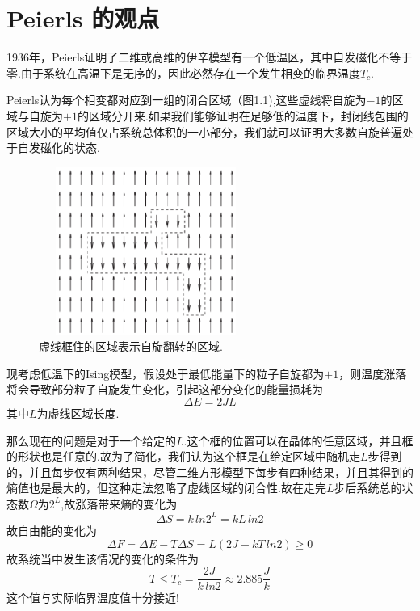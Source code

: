 \documentclass[a4paper]{book}
\begin{document}
\chapter{Peierls 的观点}
1936年，Peierls证明了二维或高维的伊辛模型有一个低温区，其中自发磁化不等于零.由于系统在高温下是无序的，因此必然存在一个发生相变的临界温度$T_c$.\par 
Peierls认为每个相变都对应到一组的闭合区域（图1.1),这些虚线将自旋为$-1$的区域与自旋为$+1$的区域分开来.如果我们能够证明在足够低的温度下，封闭线包围的区域大小的平均值仅占系统总体积的一小部分，我们就可以证明大多数自旋普遍处于自发磁化的状态.
 \begin{figure}[!h]
	\centering
	\includegraphics[width=7cm,height=5.5cm]{figures/1.eps}
	\caption{虚线框住的区域表示自旋翻转的区域.}
\end{figure}
现考虑低温下的Ising模型，假设处于最低能量下的粒子自旋都为$+1$，则温度涨落将会导致部分粒子自旋发生变化，引起这部分变化的能量损耗为
\begin{equation}\label{1.1}
	\varDelta E=2JL
\end{equation}
其中$L$为虚线区域长度.\par 
那么现在的问题是对于一个给定的$L$.这个框的位置可以在晶体的任意区域，并且框的形状也是任意的.故为了简化，我们认为这个框是在给定区域中随机走$L$步得到的，并且每步仅有两种结果，尽管二维方形模型下每步有四种结果，并且其得到的熵值也是最大的，但这种走法忽略了虚线区域的闭合性.故在走完$L$步后系统总的状态数$\Omega$为$2^L$,故涨落带来熵的变化为
\begin{equation}
	\varDelta S=k\,ln2^L=kL\,ln2
\end{equation}
故自由能的变化为
\begin{equation}
	\varDelta F=\varDelta E-T\varDelta S=L(2J-kT\,ln2)\geq0
\end{equation}
故系统当中发生该情况的变化的条件为
\begin{equation}\label{1.4}
	T\leq T_c=\frac{2J}{k\,ln2}\approx2.885\frac{J}{k}
\end{equation}
这个值与实际临界温度值十分接近!
\let\cleardoublepage\clearpage %
\end{document}
